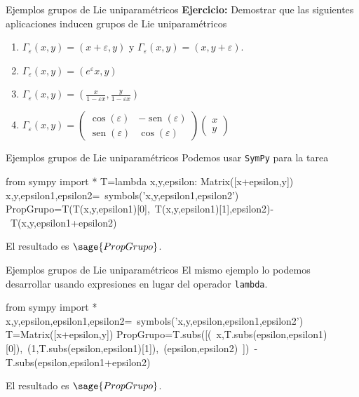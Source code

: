 \documentclass[handout,hyperref={colorlinks=true}]{beamer}
\renewcommand{\epsilon}{\varepsilon}
\DeclareMathOperator{\sen}{sen}
\begin{document}
\begin{frame}{Ejemplos grupos de Lie uniparamétricos}
\textbf{Ejercicio:} Demostrar que las siguientes aplicaciones inducen grupos de Lie uniparamétricos
\begin{enumerate}
\item<+-> $\Gamma_{\epsilon}(x,y)=(x+\epsilon,y)$ y $\Gamma_{\epsilon}(x,y)=(x,y+\epsilon)$.
\item<+-> $\Gamma_{\epsilon}(x,y)=(e^{\epsilon}x,y)$
\item<+->$\Gamma_{\epsilon}(x,y)=\left(\frac{x}{1-\epsilon x},\frac{y}{1-\epsilon x} \right)$
\item<+->$\Gamma_{\epsilon}(x,y)=\begin{pmatrix} \cos(\epsilon) & -\sen(\epsilon)
\\ \sen(\epsilon) & \cos(\epsilon)
\end{pmatrix} \begin{pmatrix} x\\ y
\end{pmatrix}
$
\end{enumerate}

\end{frame}

\begin{frame}[fragile]{Ejemplos grupos de Lie uniparamétricos}
Podemos usar \texttt{SymPy} para la tarea
\begin{sageblock}
from sympy import *
T=lambda x,y,epsilon:  Matrix([x+epsilon,y])
x,y,epsilon1,epsilon2=\
symbols('x,y,epsilon1,epsilon2')
PropGrupo=T(T(x,y,epsilon1)[0],\
T(x,y,epsilon1)[1],epsilon2)-\
T(x,y,epsilon1+epsilon2)
\end{sageblock}

El resultado es $\sage{PropGrupo}$.
\end{frame}

\begin{frame}[fragile]{Ejemplos grupos de Lie uniparamétricos}
El mismo ejemplo lo podemos desarrollar usando expresiones en lugar del operador \texttt{lambda}.
\begin{sageblock}
from sympy import *
x,y,epsilon,epsilon1,epsilon2=\
symbols('x,y,epsilon,epsilon1,epsilon2')
T=Matrix([x+epsilon,y])
PropGrupo=T.subs([(\
x,T.subs(epsilon,epsilon1)[0]),\
(1,T.subs(epsilon,epsilon1)[1]),\
(epsilon,epsilon2)\
])\
-T.subs(epsilon,epsilon1+epsilon2)

\end{sageblock}

El resultado es $\sage{PropGrupo}$.
\end{frame}
\end{document}
